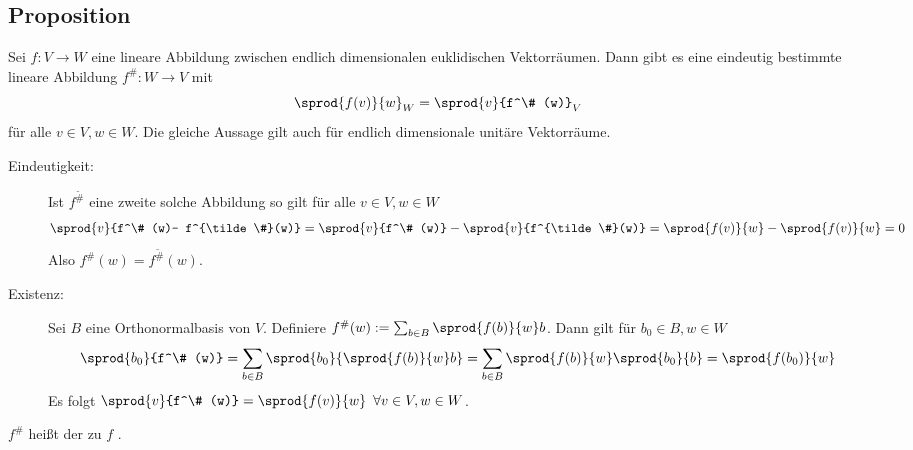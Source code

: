 \subsection[Proposition zum adjungierten Homomorphismus]{Proposition} %
\label{sub:1213}
Sei $f : V \to W$ eine lineare Abbildung zwischen endlich dimensionalen euklidischen Vektorräumen. Dann gibt es eine eindeutig bestimmte lineare Abbildung 
$f^\# : W \to V$ mit
\[
	\sprod{f(v)}{w}_W = \sprod{v}{f^\# (w)}_V
\]
für alle $v \in V, w \in W$. Die gleiche Aussage gilt auch für endlich dimensionale unitäre Vektorräume.
\begin{description}
	\item[Eindeutigkeit:] Ist $f^{\tilde \#}$ eine zweite solche Abbildung so gilt für alle $v \in V, w \in W$
	\begin{align*}
		\sprod{v}{f^\# (w)- f^{\tilde \#}(w)} = \sprod{v}{f^\# (w)} - \sprod{v}{f^{\tilde \#}(w)} = \sprod{f(v)}{w} - \sprod{f(v)}{w} = 0 
	\end{align*}
	Also $f^\# (w) = f^{\tilde \#}(w)$.
	\item[Existenz:] Sei $B$ eine Orthonormalbasis von $V$. Definiere $f^\# (w) := \sum_{b \in B} \sprod{f(b)}{w} b  $. Dann gilt für $b_0 \in B, w \in W$
	\begin{align*}
		\sprod{b_0}{f^\# (w)} = \sum_{b \in B} \sprod{b_0}{\sprod{f(b)}{w} b \text{\rule[-2mm]{0mm}{6mm}}}   = \sum_{b \in B} \sprod{f(b)}{w} \sprod{b_0}{b}
		= \sprod{f(b_0)}{w}    
	\end{align*}
	Es folgt $\sprod{v}{f^\# (w)} = \sprod{f(v)}{w}  \enspace\forall v \in V, w \in W$. \bewende
\end{description}
$f^\#$ heißt der zu $f$ . 

